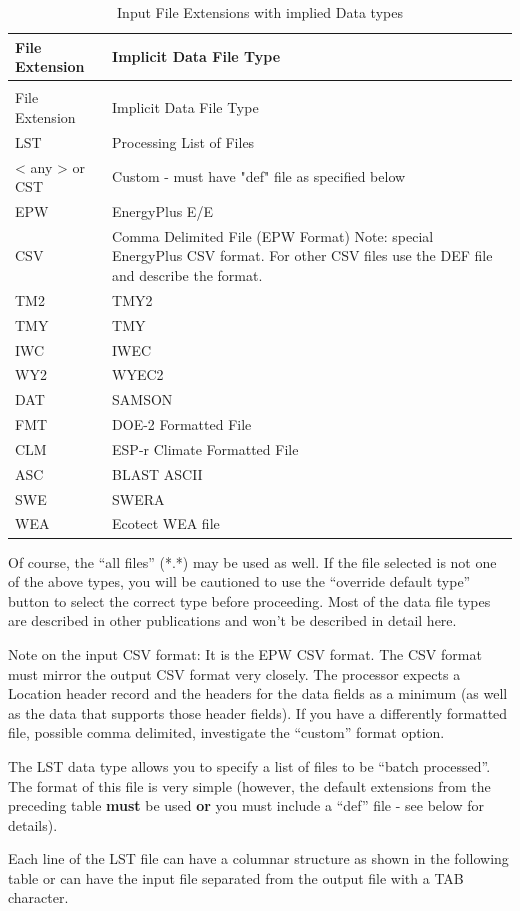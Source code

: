 \begin{longtable}[c]{p{1.5in}p{4.5in}}
\caption{Input File Extensions with implied Data types \label{table:input-file-extensions-with-implied-data-types}} \tabularnewline
\toprule 
File Extension & Implicit Data File Type \tabularnewline
\midrule
\endfirsthead

\caption[]{Input File Extensions with implied Data types} \tabularnewline
\toprule 
File Extension & Implicit Data File Type \tabularnewline
\midrule
\endhead

LST & Processing List of Files \tabularnewline
< any >  or CST & Custom - must have "def" file as specified below \tabularnewline
EPW & EnergyPlus E/E \tabularnewline
CSV & Comma Delimited File (EPW Format) Note: special EnergyPlus CSV format. For other CSV files use the DEF file and describe the format. \tabularnewline
TM2 & TMY2 \tabularnewline
TMY & TMY \tabularnewline
IWC & IWEC \tabularnewline
WY2 & WYEC2 \tabularnewline
DAT & SAMSON \tabularnewline
FMT & DOE-2 Formatted File \tabularnewline
CLM & ESP-r Climate Formatted File \tabularnewline
ASC & BLAST ASCII \tabularnewline
SWE & SWERA \tabularnewline
WEA & Ecotect WEA file \tabularnewline
\bottomrule
\end{longtable}

Of course, the ``all files'' (*.*) may be used as well. If the file selected is not one of the above types, you will be cautioned to use the ``override default type'' button to select the correct type before proceeding. Most of the data file types are described in other publications and won't be described in detail here.

Note on the input CSV format: It is the EPW CSV format. The CSV format must mirror the output CSV format very closely. The processor expects a Location header record and the headers for the data fields as a minimum (as well as the data that supports those header fields). If you have a differently formatted file, possible comma delimited, investigate the ``custom'' format option.

The LST data type allows you to specify a list of files to be ``batch processed''. The format of this file is very simple (however, the default extensions from the preceding table \textbf{must} be used \textbf{or} you must include a ``def'' file - see below for details).

Each line of the LST file can have a columnar structure as shown in the following table or can have the input file separated from the output file with a TAB character.

